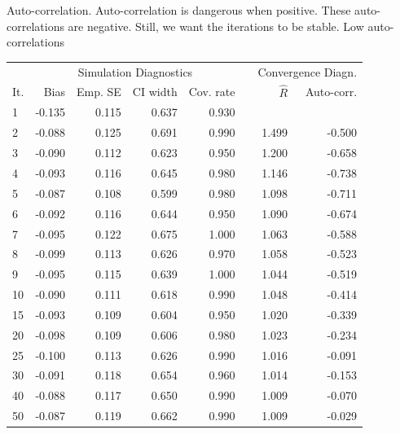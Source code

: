 \documentclass[article]{jss}
\begin{document}
Auto-correlation. Auto-correlation is dangerous when positive. These auto-correlations are negative. Still, we want the iterations to be stable. Low auto-correlations 


\begin{table}[ht]
\centering
\begin{tabular}{lrrrrrrr}
  \hline
  &\multicolumn{4}{c}{Simulation Diagnostics}& & \multicolumn{2}{c}{Convergence Diagn.} \\
  \cline{2-5} \cline{7-8}
It. & Bias & Emp. SE & CI width & Cov. rate & & $\widehat{R}$ & Auto-corr. \\ 
  \hline
  1 & -0.135 & 0.115 & 0.637 & 0.930 &  & & \\ 
  2 & -0.088 & 0.125 & 0.691 & 0.990 & & 1.499 & -0.500 \\ 
  3 & -0.090 & 0.112 & 0.623 & 0.950 & &  1.200 & -0.658 \\ 
  4 & -0.093 & 0.116 & 0.645 & 0.980 &  & 1.146 & -0.738 \\ 
  5 & -0.087 & 0.108 & 0.599 & 0.980 &  & 1.098 & -0.711 \\ 
  6 & -0.092 & 0.116 & 0.644 & 0.950 & &  1.090 & -0.674 \\ 
  7 & -0.095 & 0.122 & 0.675 & 1.000 & &  1.063 & -0.588 \\ 
  8 & -0.099 & 0.113 & 0.626 & 0.970 & &  1.058 & -0.523 \\ 
  9 & -0.095 & 0.115 & 0.639 & 1.000 & &  1.044 & -0.519 \\ 
  10 & -0.090 & 0.111 & 0.618 & 0.990 & &  1.048 & -0.414 \\ 
  15 & -0.093 & 0.109 & 0.604 & 0.950 & &  1.020 & -0.339 \\ 
  20 & -0.098 & 0.109 & 0.606 & 0.980 & &  1.023 & -0.234 \\ 
  25 & -0.100 & 0.113 & 0.626 & 0.990 &  & 1.016 & -0.091 \\ 
  30 & -0.091 & 0.118 & 0.654 & 0.960 & &  1.014 & -0.153 \\ 
  40 & -0.088 & 0.117 & 0.650 & 0.990 &  & 1.009 & -0.070 \\ 
  50 & -0.087 & 0.119 & 0.662 & 0.990 &  & 1.009 & -0.029 \\ 

\end{tabular}
\end{table}
\end{document}
